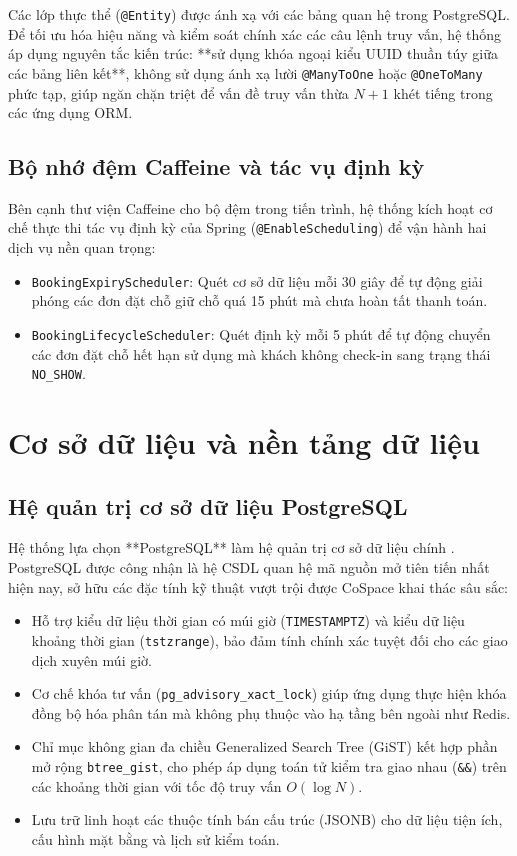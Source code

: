 Các lớp thực thể (\texttt{@Entity}) được ánh xạ với các bảng quan hệ trong PostgreSQL. Để tối ưu hóa hiệu năng và kiểm soát chính xác các câu lệnh truy vấn, hệ thống áp dụng nguyên tắc kiến trúc: **sử dụng khóa ngoại kiểu UUID thuần túy giữa các bảng liên kết**, không sử dụng ánh xạ lười \texttt{@ManyToOne} hoặc \texttt{@OneToMany} phức tạp, giúp ngăn chặn triệt để vấn đề truy vấn thừa $N+1$ khét tiếng trong các ứng dụng ORM.

\subsection{Bộ nhớ đệm Caffeine và tác vụ định kỳ}
Bên cạnh thư viện Caffeine cho bộ đệm trong tiến trình, hệ thống kích hoạt cơ chế thực thi tác vụ định kỳ của Spring (\texttt{@EnableScheduling}) để vận hành hai dịch vụ nền quan trọng:
\begin{itemize}
    \item \texttt{BookingExpiryScheduler}: Quét cơ sở dữ liệu mỗi 30 giây để tự động giải phóng các đơn đặt chỗ giữ chỗ quá 15 phút mà chưa hoàn tất thanh toán.
    \item \texttt{BookingLifecycleScheduler}: Quét định kỳ mỗi 5 phút để tự động chuyển các đơn đặt chỗ hết hạn sử dụng mà khách không check-in sang trạng thái \texttt{NO\_SHOW}.
\end{itemize}

\section{Cơ sở dữ liệu và nền tảng dữ liệu}
\label{sec:cn_database}

\subsection{Hệ quản trị cơ sở dữ liệu PostgreSQL}
Hệ thống lựa chọn **PostgreSQL** làm hệ quản trị cơ sở dữ liệu chính \cite{postgresql_documentation}. PostgreSQL được công nhận là hệ CSDL quan hệ mã nguồn mở tiên tiến nhất hiện nay, sở hữu các đặc tính kỹ thuật vượt trội được CoSpace khai thác sâu sắc:
\begin{itemize}
    \item Hỗ trợ kiểu dữ liệu thời gian có múi giờ (\texttt{TIMESTAMPTZ}) và kiểu dữ liệu khoảng thời gian (\texttt{tstzrange}), bảo đảm tính chính xác tuyệt đối cho các giao dịch xuyên múi giờ.
    \item Cơ chế khóa tư vấn (\texttt{pg\_advisory\_xact\_lock}) giúp ứng dụng thực hiện khóa đồng bộ hóa phân tán mà không phụ thuộc vào hạ tầng bên ngoài như Redis.
    \item Chỉ mục không gian đa chiều Generalized Search Tree (GiST) kết hợp phần mở rộng \texttt{btree\_gist}, cho phép áp dụng toán tử kiểm tra giao nhau (\texttt{\&\&}) trên các khoảng thời gian với tốc độ truy vấn $O(\log N)$.
    \item Lưu trữ linh hoạt các thuộc tính bán cấu trúc (JSONB) cho dữ liệu tiện ích, cấu hình mặt bằng và lịch sử kiểm toán.
\end{itemize}


